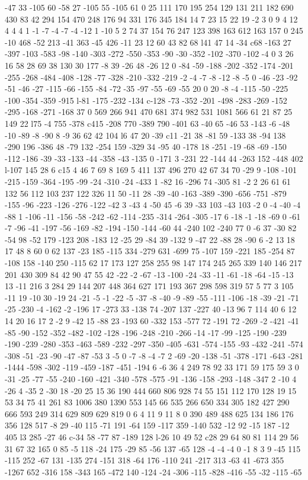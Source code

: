 -47 33 -105 60 -58 27 -105 55 -105 61 0 25 111 170 195 254 129 131 211 182 690 430 83 42 294 154 470 248 176 94 331 176 345 184 14 7 23 15 22 19 -2 3 0 9 4 12 4 4 4 1 -1 -7 -4 -7 -4 -12 1 -10 5 2 74 37 154 76 247 123 398 163 612 163 157 0 245 -10 468 -52 213 -41 363 -45 426 -11 23 12 60 43 82 68 l41 47 14 -34 c68 -163 27 -397 -103 -583 -98 -140 -303 -272 -550 -353 -90 -30 -352 -102 -370 -102 -4 0 3 26 16 58 28 69 38 130 30 177 -8 39 -26 48 -26 12 0 -84 -59 -188 -202 -352 -174 -201 -255 -268 -484 -408 -128 -77 -328 -210 -332 -219 -2 -4 -7 -8 -12 -8 -5 0 -46 -23 -92 -51 -46 -27 -115 -66 -155 -84 -72 -35 -97 -55 -69 -55 20 0 20 -8 -4 -115 -50 -225 -100 -354 -359 -915 l-81 -175 -232 -134 c-128 -73 -352 -201 -498 -283 -269 -152 -295 -168 -271 -168 37 0 569 266 941 470 681 374 982 531 1081 566 61 21 87 25 149 22 l75 -4 755 -378 c415 -208 770 -389 790 -401 63 -40 65 -46 53 -143 -6 -48 -10 -89 -8 -90 8 -9 36 62 42 104 l6 47 20 -39 c11 -21 38 -81 59 -133 38 -94 138 -290 196 -386 48 -79 132 -254 159 -329 34 -95 40 -178 18 -251 -19 -68 -69 -150 -112 -186 -39 -33 -133 -44 -358 -43 -135 0 -171 3 -231 22 -144 44 -263 152 -448 402 l-107 145 28 6 c15 4 46 7 69 8 169 5 411 137 496 270 42 67 34 70 -29 9 -108 -101 -215 -159 -364 -195 -99 -24 -310 -24 -433 1 -82 16 -296 74 -305 81 -2 2 26 61 61 132 56 112 103 237 122 326 11 50 -11 28 -39 -40 -163 -389 -390 -656 -751 -879 -155 -96 -223 -126 -276 -122 -42 3 -43 4 -50 45 -6 39 -33 103 -43 103 -2 0 -4 -40 -4 -88 1 -106 -11 -156 -58 -242 -62 -114 -235 -314 -264 -305 -17 6 -18 -1 -18 -69 0 -61 -7 -96 -41 -197 -56 -169 -82 -194 -150 -144 -60 44 -240 102 -240 77 0 -6 37 -30 82 -54 98 -52 179 -123 208 -183 12 -25 29 -84 39 -132 9 -47 22 -88 28 -90 6 -2 13 18 17 48 8 60 0 62 137 -23 185 -115 334 -279 631 -699 75 -107 159 -221 185 -254 87 -108 158 -140 250 -115 62 17 173 127 258 255 98 147 174 245 265 339 140 146 217 201 430 309 84 42 90 47 55 42 -22 -2 -67 -13 -100 -24 -33 -11 -61 -18 -64 -15 -13 13 -11 216 3 284 29 144 207 448 364 627 171 193 367 298 598 319 57 5 77 3 105 -11 19 -10 30 -19 24 -21 -5 -1 -22 -5 -37 -8 -40 -9 -89 -55 -111 -106 -18 -39 -21 -71 -25 -230 -4 -162 -2 -196 17 -273 33 -138 74 -207 137 -227 40 -13 96 7 114 40 6 12 14 20 16 17 2 -2 9 -42 15 -88 23 -193 60 -332 153 -577 72 -191 72 -269 -2 -421 -41 -85 -90 -152 -352 -482 -102 -128 -196 -248 -210 -266 -14 -17 -99 -125 -190 -239 -190 -239 -280 -353 -463 -589 -232 -297 -350 -405 -631 -574 -155 -93 -432 -241 -574 -308 -51 -23 -90 -47 -87 -53 3 -5 0 -7 -8 -4 -7 2 -69 -20 -138 -51 -378 -171 -643 -281 -1444 -598 -302 -119 -459 -187 -451 -194 6 -6 36 4 249 78 92 33 171 59 175 59 3 0 -31 -25 -77 -55 -240 -160 -421 -340 -578 -575 -91 -136 -158 -293 -148 -347 2 -10 4 -26 4 -35 2 -30 18 -20 25 15 36 190 444 660 806 928 74 55 151 112 170 128 19 15 53 34 75 41 261 83 1006 380 1390 553 145 66 535 266 650 334 305 182 427 290 666 593 249 314 629 809 629 819 0 6 4 11 9 11 8 0 390 489 488 625 134 186 176 356 128 517 -8 29 -40 115 -71 191 -64 159 -117 359 -140 532 -12 92 -15 187 -12 405 l3 285 -27 46 c-34 58 -77 87 -189 128 l-26 10 49 52 c28 29 64 80 81 114 29 56 31 67 32 165 0 85 -5 118 -24 175 -29 85 -56 137 -65 128 -4 -4 -4 0 -1 8 3 9 -45 115 -115 252 -67 131 -135 274 -151 318 -64 176 -110 241 -217 313 -63 41 -673 355 -1267 652 -316 158 -343 165 -472 140 -124 -24 -306 -115 -828 -416 -55 -32 -115 -65 